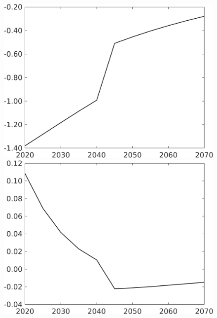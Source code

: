 \documentclass[12pt]{article}
\begin{document}
\begin{figure}[h!!]
\begin{minipage}[]{0.32\textwidth}
	\end{minipage}		
	\begin{minipage}[]{0.32\textwidth}
		\includegraphics[width=1\textwidth]{../../codding_model/own_basedOnFried/optimalPol_010922_revision/figures/all_13Sept22/CompTaufPER_bytaul_Equlab_Reg0_gAg_spillover0_nsk0_xgr0_knspil1_sep1_LFlimit1_emsbase0_countec0_GovRev0_etaa0.79_lgd0.png}
	\end{minipage}
	\begin{minipage}[]{0.32\textwidth}
		\includegraphics[width=1\textwidth]{../../codding_model/own_basedOnFried/optimalPol_010922_revision/figures/all_13Sept22/CompTaufPER_bytaul_Equlab_Reg0_gAn_spillover0_nsk0_xgr0_knspil1_sep1_LFlimit1_emsbase0_countec0_GovRev0_etaa0.79_lgd0.png}

\end{minipage}
\end{figure}
\end{document}
